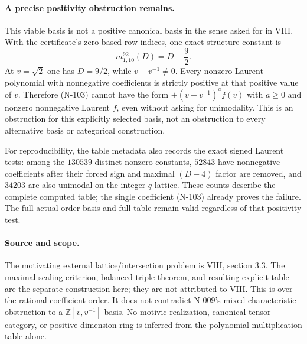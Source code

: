 \paragraph{A precise positivity obstruction remains.}
This viable basis is not a positive canonical basis in the sense
asked for in VIII.  With the certificate's zero-based row indices,
one exact structure constant is
\[
                 m_{1,10}^{92}(D)=D-\frac92.
 \tag{N-103}
\]
At $v=\sqrt2$ one has $D=9/2$, while $v-v^{-1}\ne0$.
Every nonzero Laurent polynomial with nonnegative coefficients is
strictly positive at that positive value of $v$.
Therefore (N-103) cannot have the form
$\pm(v-v^{-1})^a f(v)$ with $a\ge0$ and nonzero nonnegative
Laurent $f$, even without asking for unimodality.
This is an obstruction for this explicitly selected basis, not an
obstruction to every alternative basis or categorical construction.

For reproducibility, the table metadata also records the exact
signed Laurent tests: among the $130539$ distinct nonzero constants,
$52843$ have nonnegative coefficients after their forced sign and
maximal $(D-4)$ factor are removed, and $34203$ are also unimodal on
the integer $q$ lattice.  These counts describe the complete computed
table; the single coefficient (N-103) already proves the failure.
The full actual-order basis and full table remain valid regardless
of that positivity test.

\paragraph{Source and scope.}
The motivating external lattice/intersection problem is VIII,
section 3.3.  The maximal-scaling criterion, balanced-triple theorem,
and resulting explicit table are the separate construction here;
they are not attributed to VIII.  This is over the rational coefficient
order.  It does not contradict N-009's mixed-characteristic obstruction
to a $\mathbb Z[v,v^{-1}]$-basis.  No motivic realization, canonical
tensor category, or positive dimension ring is inferred from the
polynomial multiplication table alone.

